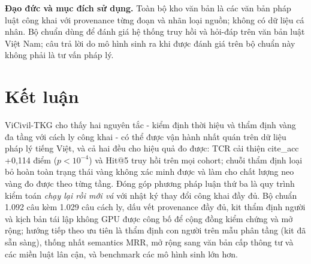 \documentclass[11pt,a4paper]{article}
\begin{document}
\textbf{Đạo đức và mục đích sử dụng.} Toàn bộ kho văn bản là các văn bản pháp luật công khai với provenance từng đoạn và nhãn loại nguồn; không có dữ liệu cá nhân. Bộ chuẩn dùng để đánh giá hệ thống truy hồi và hỏi-đáp trên văn bản luật Việt Nam; câu trả lời do mô hình sinh ra khi được đánh giá trên bộ chuẩn này không phải là tư vấn pháp lý.

\section{Kết luận}

ViCivil-TKG cho thấy hai nguyên tắc - kiểm định thời hiệu và thẩm định vàng đa tầng với cách ly công khai - có thể được vận hành nhất quán trên dữ liệu pháp lý tiếng Việt, và cả hai đều cho hiệu quả đo được: TCR cải thiện cite\_acc +0,114 điểm ($p<10^{-4}$) và Hit@5 truy hồi trên mọi cohort; chuỗi thẩm định loại bỏ hoàn toàn trạng thái vàng không xác minh được và làm cho chất lượng neo vàng đo được theo từng tầng. Đóng góp phương pháp luận thứ ba là quy trình kiểm toán \emph{chạy lại rồi mới vá} với nhật ký thay đổi công khai đầy đủ. Bộ chuẩn 1.092 câu kèm 1.029 câu cách ly, dấu vết provenance đầy đủ, kit thẩm định người và kịch bản tái lập không GPU được công bố để cộng đồng kiểm chứng và mở rộng; hướng tiếp theo ưu tiên là thẩm định con người trên mẫu phân tầng (kit đã sẵn sàng), thống nhất semantics MRR, mở rộng sang văn bản cấp thông tư và các miền luật lân cận, và benchmark các mô hình sinh lớn hơn.
\end{document}
